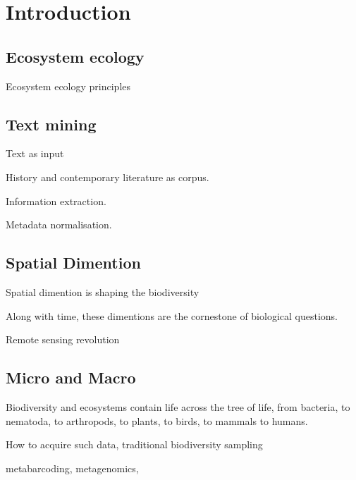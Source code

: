 % 
% 


\chapter{Introduction}
\label{cha:intro}



\section{Ecosystem ecology}
\label{sec:intro-ecosystem}

Ecosystem ecology principles \citep{Chapin_Matson_Vitousek_2011}

\section{Text mining}
\label{sec:text-mining}

Text as input

History and contemporary literature as corpus. 

Information extraction. 

Metadata normalisation.



\section{Spatial Dimention}
\label{sec:crete-spatial}

Spatial dimention is shaping the biodiversity

Along with time, these dimentions are the cornestone of 
biological questions. 


Remote sensing revolution

\section{Micro and Macro}
\label{sec:crete-micro-macro}

Biodiversity and ecosystems contain life across the tree of life, from
bacteria, to nematoda, to arthropods, to plants, to birds, to mammals to 
humans. 

How to acquire such data, traditional biodiversity sampling 

metabarcoding, 
metagenomics,

